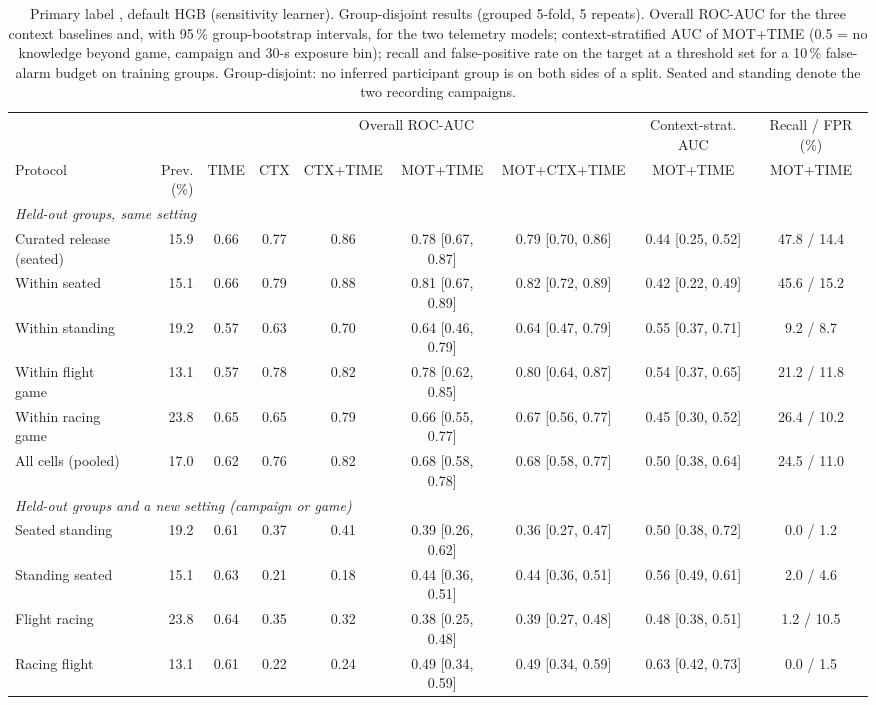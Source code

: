 \begin{table}[t]
\centering
\footnotesize
\caption{Primary label \sevtwo{}, default HGB (sensitivity learner). Group-disjoint results (grouped 5-fold, 5 repeats). Overall ROC-AUC for the three context baselines and, with 95\,\% group-bootstrap intervals, for the two telemetry models; context-stratified AUC of MOT+TIME (0.5 = no knowledge beyond game, campaign and 30-s exposure bin); recall and false-positive rate on the target at a threshold set for a 10\,\% false-alarm budget on training groups. Group-disjoint: no inferred participant group is on both sides of a split. Seated and standing denote the two recording campaigns.}
\label{tab:supp_hgb}
\footnotesize
\setlength{\tabcolsep}{2.4pt}
\begin{tabular}{lrccccccc}
\toprule
 & & \multicolumn{5}{c}{Overall ROC-AUC} & Context-strat. AUC & Recall / FPR (\%) \\
\cmidrule(lr){3-7}\cmidrule(lr){8-8}\cmidrule(lr){9-9}
Protocol & Prev. (\%) & TIME & CTX & CTX+TIME & MOT+TIME & MOT+CTX+TIME & MOT+TIME & MOT+TIME \\
\midrule
\multicolumn{9}{l}{\emph{Held-out groups, same setting}} \\
Curated release (seated) & 15.9 & 0.66 & 0.77 & 0.86 & 0.78 [0.67, 0.87] & 0.79 [0.70, 0.86] & 0.44 [0.25, 0.52] & 47.8 / 14.4 \\
Within seated & 15.1 & 0.66 & 0.79 & 0.88 & 0.81 [0.67, 0.89] & 0.82 [0.72, 0.89] & 0.42 [0.22, 0.49] & 45.6 / 15.2 \\
Within standing & 19.2 & 0.57 & 0.63 & 0.70 & 0.64 [0.46, 0.79] & 0.64 [0.47, 0.79] & 0.55 [0.37, 0.71] & 9.2 / 8.7 \\
Within flight game & 13.1 & 0.57 & 0.78 & 0.82 & 0.78 [0.62, 0.85] & 0.80 [0.64, 0.87] & 0.54 [0.37, 0.65] & 21.2 / 11.8 \\
Within racing game & 23.8 & 0.65 & 0.65 & 0.79 & 0.66 [0.55, 0.77] & 0.67 [0.56, 0.77] & 0.45 [0.30, 0.52] & 26.4 / 10.2 \\
All cells (pooled) & 17.0 & 0.62 & 0.76 & 0.82 & 0.68 [0.58, 0.78] & 0.68 [0.58, 0.77] & 0.50 [0.38, 0.64] & 24.5 / 11.0 \\
\multicolumn{9}{l}{\emph{Held-out groups and a new setting (campaign or game)}} \\
Seated \ra{} standing & 19.2 & 0.61 & 0.37 & 0.41 & 0.39 [0.26, 0.62] & 0.36 [0.27, 0.47] & 0.50 [0.38, 0.72] & 0.0 / 1.2 \\
Standing \ra{} seated & 15.1 & 0.63 & 0.21 & 0.18 & 0.44 [0.36, 0.51] & 0.44 [0.36, 0.51] & 0.56 [0.49, 0.61] & 2.0 / 4.6 \\
Flight \ra{} racing & 23.8 & 0.64 & 0.35 & 0.32 & 0.38 [0.25, 0.48] & 0.39 [0.27, 0.48] & 0.48 [0.38, 0.51] & 1.2 / 10.5 \\
Racing \ra{} flight & 13.1 & 0.61 & 0.22 & 0.24 & 0.49 [0.34, 0.59] & 0.49 [0.34, 0.59] & 0.63 [0.42, 0.73] & 0.0 / 1.5 \\
\bottomrule
\end{tabular}
\end{table}